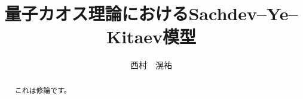 \title{量子カオス理論におけるSachdev--Ye--Kitaev模型}
\author{西村　滉祐}
\date{}
\maketitle

\begin{abstract}
	これは修論です。
\end{abstract}

\thispagestyle{empty}
\pagebreak
